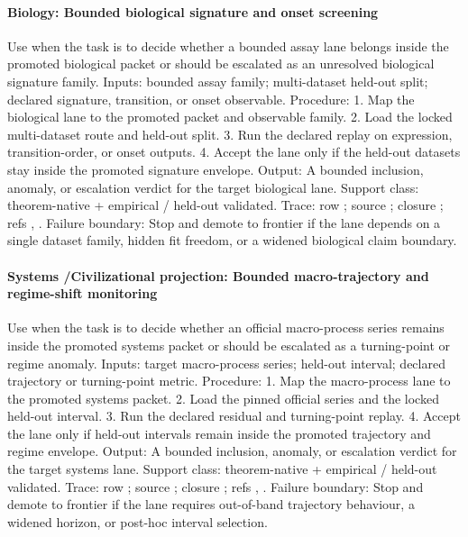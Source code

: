 \paragraph{Biology: Bounded biological signature and onset screening}
Use when the task is to decide whether a bounded assay lane belongs inside the promoted biological packet or should be escalated as an unresolved biological signature family.
Inputs: bounded assay family; \allowbreak multi-dataset held-out split; \allowbreak declared signature, transition, or onset observable.
Procedure: 1. Map the biological lane to the promoted packet and observable family. 2. Load the locked multi-dataset route and held-out split. 3. Run the declared replay on expression, transition-order, or onset outputs. 4. Accept the lane only if the held-out datasets stay inside the promoted signature envelope.
Output: A bounded inclusion, anomaly, or escalation verdict for the target biological lane.
Support class: theorem-native + empirical / held-out validated.
Trace: row ; \allowbreak source ; \allowbreak closure ; \allowbreak refs , \allowbreak {}.
Failure boundary: Stop and demote to frontier if the lane depends on a single dataset family, hidden fit freedom, or a widened biological claim boundary.

\paragraph{Systems /\allowbreak Civili\allowbreak{}zational\allowbreak{} projection: Bounded macro-trajectory and regime-shift monitoring}
Use when the task is to decide whether an official macro-process series remains inside the promoted systems packet or should be escalated as a turning-point or regime anomaly.
Inputs: target macro-process series; \allowbreak held-out interval; \allowbreak declared trajectory or turning-point metric.
Procedure: 1. Map the macro-process lane to the promoted systems packet. 2. Load the pinned official series and the locked held-out interval. 3. Run the declared residual and turning-point replay. 4. Accept the lane only if held-out intervals remain inside the promoted trajectory and regime envelope.
Output: A bounded inclusion, anomaly, or escalation verdict for the target systems lane.
Support class: theorem-native + empirical / held-out validated.
Trace: row ; \allowbreak source ; \allowbreak closure ; \allowbreak refs , \allowbreak {}.
Failure boundary: Stop and demote to frontier if the lane requires out-of-band trajectory behaviour, a widened horizon, or post-hoc interval selection.

